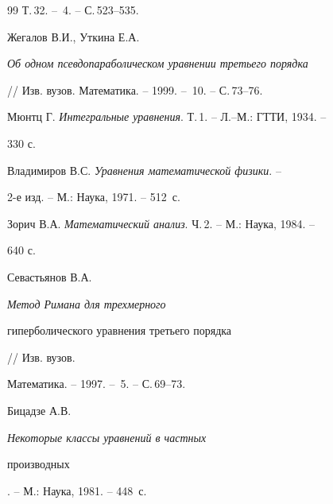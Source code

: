 \begin{thebibliography}{99}
Т.\,32. -- \No\,4. -- С.\,523--535.




Жегалов В.И., Уткина Е.А.


{\em Об одном псевдопараболическом уравнении третьего порядка}


// Изв. вузов. Математика. -- 1999. -- \No\,10. -- С.\,73--76.




Мюнтц Г. {\em Интегральные уравнения}. Т.\,1. -- Л.--М.: ГТТИ, 1934. --


330 с.




Владимиров В.С. {\em Уравнения математической физики}. --


2-е изд. -- М.: Наука, 1971. -- 512~с.




Зорич В.А. {\em Математический анализ}. Ч.\,2. -- М.: Наука, 1984. --


640 с.




Севастьянов В.А. {\em Метод Римана для трехмерного


гиперболического уравнения третьего порядка} // Изв. вузов.


Математика. -- 1997. -- \No\,5. -- С.\,69--73.




Бицадзе А.В. {\em Некоторые классы уравнений в частных


производных}. -- М.: Наука, 1981. -- 448~с.





\end{thebibliography}





\vskip 2cm














\label{end}








